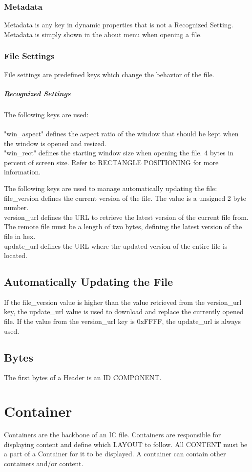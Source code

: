 \documentclass{report}
\begin{document}
\subsubsection{Metadata}
Metadata is any key in dynamic properties that is not a Recognized Setting. Metadata is simply shown in the about menu when opening a file.
\subsubsection{File Settings}
File settings are predefined keys which change the behavior of the file. 
\subparagraph{Recognized Settings}
The following keys are used:\\
\\
"win\_aspect" defines the aspect ratio of the window that should be kept when the window is opened and resized.\\
"win\_rect" defines the starting window size when opening the file. 4 bytes in percent of screen size. Refer to RECTANGLE POSITIONING for more information.

The following keys are used to manage automatically updating the file:\\
file\_version defines the current version of the file. The value is a unsigned 2 byte number.\\
version\_url defines the URL to retrieve the latest version of the current file from. The remote file must be a length of two bytes, defining the latest version of the file in hex.\\
update\_url defines the URL where the updated version of the entire file is located.


\subsection{Automatically Updating the File}
If the file\_version value is higher than the value retrieved from the version\_url key, the update\_url value is used to download and replace the currently opened file. If the value from the version\_url key is 0xFFFF, the update\_url is always used.

\subsection{Bytes}
The first bytes of a Header is an ID COMPONENT. 

\section{Container}
Containers are the backbone of an IC file. Containers are responsible for displaying content and define which LAYOUT to follow. All CONTENT must be a part of a Container for it to be displayed. A container can contain other containers and/or content.\\
\end{document}

